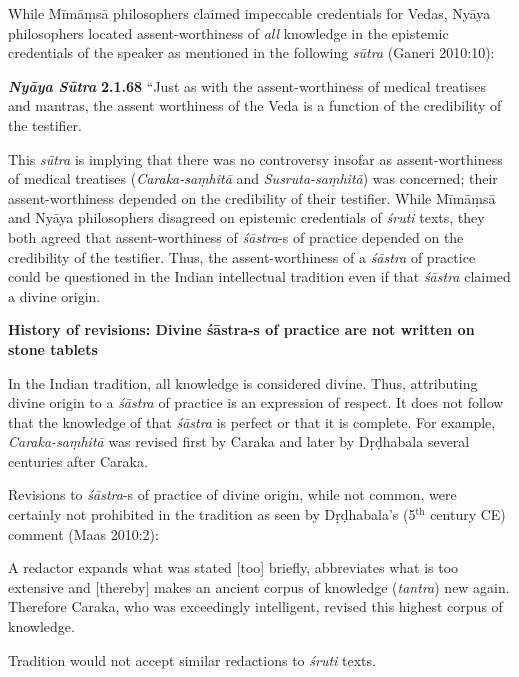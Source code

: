 While Mīmāṃsā philosophers claimed impeccable credentials for Vedas, Nyāya philosophers located assent-worthiness of {\sl all} knowledge in the epistemic credentials of the speaker as mentioned in the following {\sl sūtra} (Ganeri 2010:10):
\begin{myquote}
{{\sl\bfseries Nyāya Sūtra}\relax}  {\bf 2.1.68} ``Just as with the assent-worthiness of medical treatises and mantras, the assent worthiness of the Veda is a function of the credibility of the testifier.
\end{myquote}

This {\sl sūtra} is implying that there was no controversy insofar as assent-worthiness of medical treatises ({\sl Caraka-saṃhitā} and {\sl Susruta-saṃhitā}) was concerned; their assent-worthiness depended on the credibility of their testifier. While Mīmāṃsā and Nyāya philosophers disagreed on epistemic credentials of {\sl śruti} texts, they both agreed that assent-worthiness of {\sl śāstra}-s of practice depended on the credibility of the testifier. Thus, the assent-worthiness of a {\sl śāstra} of practice could be questioned in the Indian intellectual tradition even if that {\sl śāstra} claimed a divine origin.

{\bf History of revisions: Divine śāstra-s of practice are not written on stone tablets}

In the Indian tradition, all knowledge is considered divine.  Thus, attributing divine origin to a {\sl śāstra} of practice is an expression of respect.  It does not follow that the knowledge of that {\sl śāstra} is perfect or that it is complete.  For example, {\sl Caraka-saṃhitā} was revised first by Caraka and later by Dṛḍhabala several centuries after Caraka.

Revisions to {\sl śāstra}-s of practice of divine origin, while not common, were certainly not prohibited in the tradition as seen by Dṛḍhabala's (5$^{\text{th}}$ century CE) comment (Maas 2010:2):
\begin{myquote}
A redactor expands what was stated [too] briefly, abbreviates what is too extensive and [thereby] makes an ancient corpus of knowledge ({\sl tantra}) new again. Therefore Caraka, who was exceedingly intelligent, revised this highest corpus of knowledge.
\end{myquote}

Tradition would not accept similar redactions to {\sl śruti} texts.

